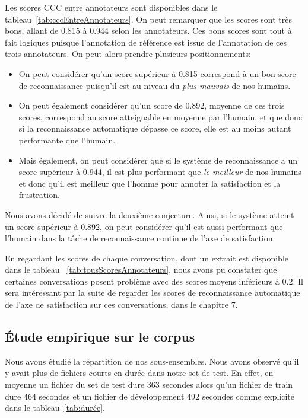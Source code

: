 Les scores CCC entre annotateurs sont disponibles dans le tableau~\ref{tab:cccEntreAnnotateurs}. On peut remarquer que les scores sont très bons, allant de 0.815 à 0.944 selon les annotateurs. Ces bons scores sont tout à fait logiques puisque l'annotation de référence est issue de l'annotation de ces trois annotateurs. On peut alors prendre plusieurs positionnements:
\begin{itemize}
  \item On peut considérer qu'un score supérieur à 0.815 correspond à un bon score de reconnaissance puisqu'il est au niveau du \textit{plus mauvais} de nos humains.
  \item On peut également considérer qu'un score de 0.892, moyenne de ces trois scores, correspond au score atteignable en moyenne par l'humain, et que donc si la reconnaissance automatique dépasse ce score, elle est au moins autant performante que l'humain.
  \item Mais également, on peut considérer que si le système de reconnaissance a un score supérieur à 0.944, il est plus performant que \textit{le meilleur} de nos humains et donc qu'il est meilleur que l'homme pour annoter la satisfaction et la frustration.
\end{itemize}

Nous avons décidé de suivre la deuxième conjecture. Ainsi, si le système atteint un score supérieur à 0.892, on peut considérer qu'il est aussi performant que l'humain dans la tâche de reconnaissance continue de l'axe de satisfaction.

En regardant les scores de chaque conversation, dont un extrait est disponible dans le tableau ~\ref{tab:tousScoresAnnotateurs}, nous avons pu constater que certaines conversations posent problème avec des scores moyens inférieurs à 0.2. Il sera intéressant par la suite de regarder les scores de reconnaissance automatique de l'axe de satisfaction sur ces conversations, dans le chapitre 7.%



\subsection{Étude empirique sur le corpus}

Nous avons étudié la répartition de nos sous-ensembles. Nous avons observé qu'il y avait plus de fichiers courts en durée dans notre set de test. En effet, en moyenne un fichier du set de test dure 363 secondes alors qu'un fichier de train dure 464 secondes et un fichier de développement 492 secondes comme explicité dans le tableau~\ref{tab:durée}.


